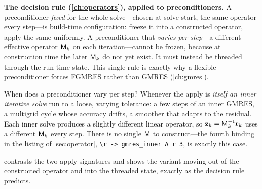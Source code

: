 \begin{keyidea}
\textbf{The decision rule (\cref{ch:operators}), applied to preconditioners.} A
preconditioner \emph{fixed} for the whole solve---chosen at solve start, the same operator
every step---is build-time configuration: freeze it into a constructed operator, apply the
same  uniformly. A preconditioner that \emph{varies per step}---a different
effective operator $\mathsf{M}_k$ on each iteration---cannot be frozen, because at construction
time the later $\mathsf{M}_k$ do not yet exist. It must instead be threaded through the run-time
state. This single rule is exactly why a flexible preconditioner forces FGMRES rather than
GMRES (\cref{ch:gmres}).
\end{keyidea}

When does a preconditioner vary per step? Whenever the apply is \emph{itself an inner
iterative solve} run to a loose, varying tolerance: a few steps of an inner GMRES, a
multigrid cycle whose accuracy drifts, a smoother that adapts to the residual. Each inner
solve produces a slightly different linear operator, so $\mathbf{z}_k=\mathsf{M}_k^{-1}\mathbf{r}_k$ uses a
different $\mathsf{M}_k$ every step. There is no single $\mathsf{M}$ to construct---the fourth
binding in the listing of \cref{sec:operator}, \lstinline[style=l4style]|\r -> gmres_inner A r 3|,
is exactly this case.

 contrasts the two apply signatures and shows the variant
moving out of the constructed operator and into the threaded state, exactly as the decision
rule predicts.

